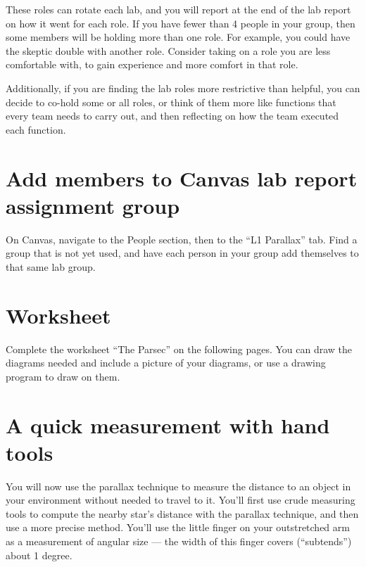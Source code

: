 These roles can rotate each lab, and you will report at the end of the lab report on how it went for each role. If you have fewer than 4 people in your group, then some members will be holding more than one role. For example, you could have the skeptic double with another role. Consider taking on a role you are less comfortable with, to gain experience and more comfort in that role.

Additionally, if you are finding the lab roles more restrictive than helpful, you can decide to co-hold some or all roles, or think of them more like functions that every team needs to carry out, and then reflecting on how the team executed each function.

\section{Add members to Canvas lab report assignment group}

\begin{steps}
	\item On Canvas, navigate to the People section, then to the ``L1 Parallax'' tab. Find a group that is not yet used, and have each person in your group add themselves to that same lab group.
\end{steps}

\section{Worksheet}

Complete the worksheet ``The Parsec'' on the following pages. You can draw the diagrams needed and include a picture of your diagrams, or use a drawing program to draw on them.



\section{A quick measurement with hand tools}

You will now use the parallax technique to measure the distance to an object in your environment without needed to travel to it. You'll first use crude measuring tools to compute the nearby star's distance with the parallax technique, and then use a more precise method. You'll use the little finger on your outstretched arm as a measurement of angular size --- the width of this finger covers (``subtends'') about 1 degree.

